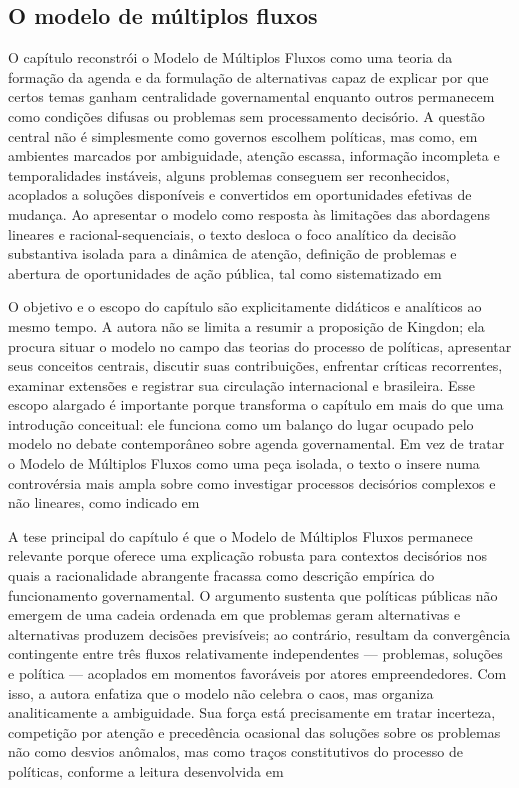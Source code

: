 \documentclass[12pt,a4paper]{article}
\begin{document}
\subsection{O modelo de múltiplos fluxos}
\label{sec:orgd989a0e}

O capítulo reconstrói o Modelo de Múltiplos Fluxos como uma teoria da formação da agenda e da formulação de alternativas capaz de explicar por que certos temas ganham centralidade governamental enquanto outros permanecem como condições difusas ou problemas sem processamento decisório. A questão central não é simplesmente como governos escolhem políticas, mas como, em ambientes marcados por ambiguidade, atenção escassa, informação incompleta e temporalidades instáveis, alguns problemas conseguem ser reconhecidos, acoplados a soluções disponíveis e convertidos em oportunidades efetivas de mudança. Ao apresentar o modelo como resposta às limitações das abordagens lineares e racional-sequenciais, o texto desloca o foco analítico da decisão substantiva isolada para a dinâmica de atenção, definição de problemas e abertura de oportunidades de ação pública, tal como sistematizado em\parencite{brasil2022_abordagens_contemporaneas}

O objetivo e o escopo do capítulo são explicitamente didáticos e analíticos ao mesmo tempo. A autora não se limita a resumir a proposição de Kingdon; ela procura situar o modelo no campo das teorias do processo de políticas, apresentar seus conceitos centrais, discutir suas contribuições, enfrentar críticas recorrentes, examinar extensões e registrar sua circulação internacional e brasileira. Esse escopo alargado é importante porque transforma o capítulo em mais do que uma introdução conceitual: ele funciona como um balanço do lugar ocupado pelo modelo no debate contemporâneo sobre agenda governamental. Em vez de tratar o Modelo de Múltiplos Fluxos como uma peça isolada, o texto o insere numa controvérsia mais ampla sobre como investigar processos decisórios complexos e não lineares, como indicado em\parencite{brasil2022_abordagens_contemporaneas}

A tese principal do capítulo é que o Modelo de Múltiplos Fluxos permanece relevante porque oferece uma explicação robusta para contextos decisórios nos quais a racionalidade abrangente fracassa como descrição empírica do funcionamento governamental. O argumento sustenta que políticas públicas não emergem de uma cadeia ordenada em que problemas geram alternativas e alternativas produzem decisões previsíveis; ao contrário, resultam da convergência contingente entre três fluxos relativamente independentes — problemas, soluções e política — acoplados em momentos favoráveis por atores empreendedores. Com isso, a autora enfatiza que o modelo não celebra o caos, mas organiza analiticamente a ambiguidade. Sua força está precisamente em tratar incerteza, competição por atenção e precedência ocasional das soluções sobre os problemas não como desvios anômalos, mas como traços constitutivos do processo de políticas, conforme a leitura desenvolvida em\parencite{brasil2022_abordagens_contemporaneas}
\end{document}
